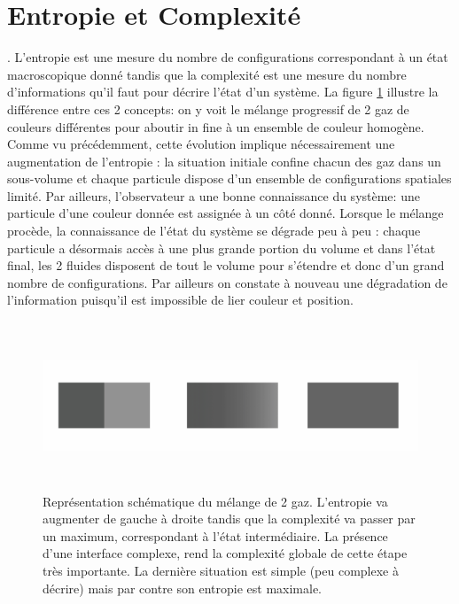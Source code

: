 \section{Entropie et Complexité}
. L'entropie est une mesure du nombre de configurations correspondant à un état macroscopique donné tandis que la complexité est une mesure du nombre d'informations qu'il faut pour décrire l'état d'un système. La figure \ref{f:melange} illustre la différence entre ces 2 concepts: on y voit le mélange progressif de 2 gaz de couleurs différentes pour aboutir in fine à un ensemble de couleur homogène. Comme vu précédemment, cette évolution implique nécessairement une augmentation de l'entropie : la situation initiale confine chacun des gaz dans un sous-volume et chaque particule dispose d'un ensemble de configurations spatiales limité. Par ailleurs, l'observateur a une bonne connaissance du système: une particule d'une couleur donnée est assignée à un côté donné. Lorsque le mélange procède, la connaissance de l'état du système se dégrade peu à peu : chaque particule a désormais accès à une plus grande portion du volume et dans l'état final, les 2 fluides disposent de tout le volume pour s'étendre et donc d'un grand nombre de configurations. Par ailleurs on constate à nouveau une dégradation de l'information puisqu'il est impossible de lier couleur et position.
\begin{figure}[htbp]
	\centering
		\includegraphics[height=5cm]{figs/melange.png}
		\caption[Entropie \& Complexité]{Représentation schématique du mélange de 2 gaz. L'entropie va augmenter de gauche à droite tandis que la complexité va passer par un maximum, correspondant à l'état intermédiaire. La présence d'une interface complexe, rend la complexité globale de cette étape très importante. La dernière situation est simple (peu complexe à décrire) mais par contre son entropie est maximale.}
	\label{f:melange}
\end{figure}

